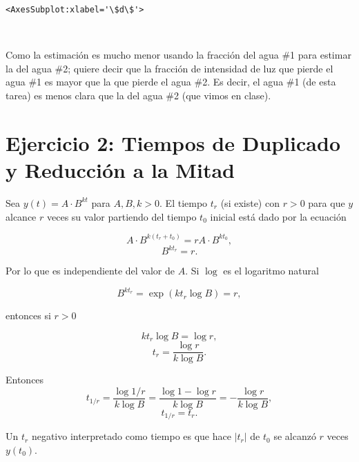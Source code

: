 \documentclass[11pt]{article}
\makeatletter
\newcommand{\boxspacing}{\kern\kvtcb@left@rule\kern\kvtcb@boxsep}
\newcommand{\prompt}[4]{
        {\ttfamily\llap{{\color{#2}[#3]:\hspace{3pt}#4}}\vspace{-\baselineskip}}
    }
\makeatother
\begin{document}
            \begin{tcolorbox}[breakable, size=fbox, boxrule=.5pt, pad at break*=1mm, opacityfill=0]
\prompt{Out}{outcolor}{43}{\boxspacing}
\begin{Verbatim}[commandchars=\\\{\}]
<AxesSubplot:xlabel='\$d\$'>
\end{Verbatim}
\end{tcolorbox}
        
    \begin{center}
    \end{center}
    { \hspace*{\fill} \\}
    
    Como la estimación es mucho menor usando la fracción del agua \#1 para
estimar la del agua \#2; quiere decir que la fracción de intensidad de
luz que pierde el agua \#1 es mayor que la que pierde el agua \#2. Es
decir, el agua \#1 (de esta tarea) es menos clara que la del agua \#2
(que vimos en clase).

    \hypertarget{ejercicio-2-tiempos-de-duplicado-y-reducciuxf3n-a-la-mitad}{%
\section*{Ejercicio 2: Tiempos de Duplicado y Reducción a la
Mitad}\label{ejercicio-2-tiempos-de-duplicado-y-reducciuxf3n-a-la-mitad}}

Sea \(y(t)=A\cdot B^{kt}\) para \(A,B,k >0\). El tiempo \(t_r\) (si
existe) con \(r> 0\) para que \(y\) alcance \(r\) veces su valor
partiendo del tiempo \(t_0\) inicial está dado por la ecuación

\[A\cdot B^{k(t_r+t_0)} = rA\cdot B^{k t_0},\] \[ B^{k t_r} = r.\]

Por lo que es independiente del valor de \(A\). Si \(\log\) es el
logaritmo natural

\[ B^{k t_r} = \exp(k t_r\log B) =r,\]

entonces si \(r > 0\)

\[k t_r \log B = \log r,\] \[t_r = \frac{\log r}{k \log B}.\]

Entonces
\[t_{1/r} = \frac{\log 1/r}{k \log B} = \frac{\log 1-\log r}{k \log B} = -\frac{\log r}{k \log B},\]
\[t_{1/r} = t_{r}.\]

Un \(t_r\) negativo interpretado como tiempo es que hace \(|t_r|\) de
\(t_0\) se alcanzó \(r\) veces \(y(t_0)\).
\end{document}
